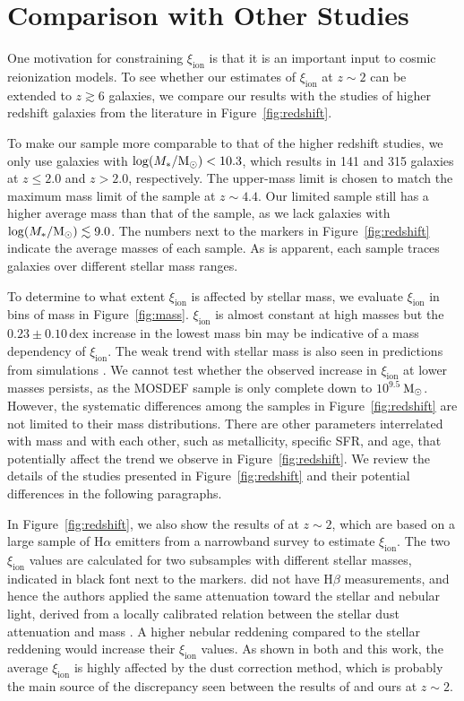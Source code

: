 \documentclass[iop]{emulateapj}
\newcommand{\xiion}{\ensuremath{\xi_{\mathrm{ion}}}}
\newcommand{\halpha}{H\ensuremath{\alpha}}
\newcommand{\hbeta}{H\ensuremath{\beta}}
\def\msun{${\rm M_\odot}$}
\begin{document}
\section{Comparison with Other Studies}
\label{sec:z}

One motivation for constraining {\xiion} is that it is an important input to cosmic reionization models. To see whether our estimates of {\xiion} at $z\sim 2$ can be extended to $z\gtrsim 6$ galaxies, we compare our results with the studies of higher redshift galaxies from the literature in Figure~\ref{fig:redshift}. 

To make our sample more comparable to that of the higher redshift studies, we only use galaxies with $\log(M_*/{\rm M_{\odot}})<10.3$, which results in 141 and 315 galaxies at $z\leq 2.0$ and $z>2.0$, respectively. The upper-mass limit is chosen to match the maximum mass limit of the \citet{bouwens16b} sample at $z\sim 4.4$. Our limited sample still has a higher average mass than that of the \citet{bouwens16b} sample, as we lack galaxies with $\log(M_*/{\rm M_{\odot}})\lesssim 9.0$. The numbers next to the markers in Figure~\ref{fig:redshift} indicate the average masses of each sample. As is apparent, each sample traces galaxies over different stellar mass ranges.

To determine to what extent {\xiion} is affected by stellar mass, we evaluate {\xiion} in bins of mass in Figure~\ref{fig:mass}. {\xiion} is almost constant at high masses but the $0.23\pm 0.10$\,dex increase in the lowest mass bin may be indicative of a mass dependency of {\xiion}. 
The weak trend with stellar mass is also seen in predictions from simulations \citep{wilkins16}.
We cannot test whether the observed increase in {\xiion} at lower masses persists, as the MOSDEF sample is only complete down to $10^{9.5}$\,\msun \citep{shivaei15b}.
However, the systematic differences among the samples in Figure~\ref{fig:redshift} are not limited to their mass distributions. There are other parameters interrelated with mass and with each other, such as metallicity, specific SFR, and age, that potentially affect the trend we observe in Figure~\ref{fig:redshift}. We review the details of the studies presented in Figure~\ref{fig:redshift} and their potential differences in the following paragraphs.

In Figure~\ref{fig:redshift}, we also show the results of \citet{matthee17} at $z\sim 2$, which are based on a large sample of {\halpha} emitters from a narrowband survey to estimate {\xiion}. The two {\xiion} values are calculated for two subsamples with different stellar masses, indicated in black font next to the markers.
\citet{matthee17} did not have {\hbeta} measurements, and hence the authors applied the same attenuation toward the stellar and nebular light, derived from a locally calibrated relation between the stellar dust attenuation and mass \citep{garnbest10}. A higher nebular reddening compared to the stellar reddening would increase their {\xiion} values.
As shown in both \citet{matthee17} and this work, the average {\xiion} is highly affected by the dust correction method, which is probably the main source of the discrepancy seen between the results of \citet{matthee17} and ours at $z\sim 2$.
\end{document}
